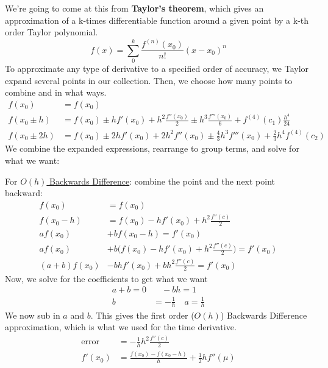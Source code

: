 \documentclass[12pt]{article}
\begin{document}
We're going to come at this from \textbf{Taylor's theorem}, which gives an approximation of a k-times differentiable function around a given point by a k-th order Taylor polynomial.
\[
f(x) = \sum_{0}^{k} \frac{f^{(n)}(x_0)}{n!}(x - x_0)^n
\]
To approximate any type of derivative to a specified order of accuracy, we Taylor expand several points in our collection. Then, we choose how many points to combine and in what ways. 
\begin{align*}
f(x_0) &= f(x_0)\\
%
f(x_0 \pm h) &= f(x_0) \pm hf'(x_0) + h^2\frac{f''(x_0)}{2} \pm h^3\frac{f'''(x_0)}{6} + f^{(4)}(c_1)\frac{h^4}{24} \\
%
f(x_0 \pm 2h) &= f(x_0) \pm 2h f'(x_0) + 2 h^2 f''(x_0) \pm \frac{4}{3} h^3 f'''(x_0) + \frac{2}{3}h^4 f^{(4)}(c_2)
\end{align*}
We combine the expanded expressions, rearrange to group terms, and solve for what we want:

For \underline{$O(h)$ Backwards Difference}: combine the point and the next point backward:
\begin{align*}
f(x_0) &= f(x_0)\\
f(x_0 - h) &= f(x_0) - hf'(x_0) + h^2\frac{f''(c)}{2}\\
a f(x_0) &+ b f(x_0 - h) = f'(x_0) \\
a f(x_0) &+ b \bigl(f(x_0) - hf'(x_0) + h^2\frac{f''(c)}{2} \bigr) = f'(x_0) \\
(a+b)f(x_0) &-bh f'(x_0) + b h^2\frac{f''(c)}{2} = f'(x_0)
\end{align*}
%
Now, we solve for the coefficients to get what we want
\begin{align*}
a+b = 0 &\quad -bh = 1 \\
b &= -\frac{1}{h} \quad a = \frac{1}{h}
\end{align*}
%
We now sub in $a$ and $b$. This gives the first order ($O(h)$) Backwards Difference approximation, which is what we used for the time derivative.
\begin{align*}
\text{error }&= -\frac{1}{h}h^2\frac{f''(c)}{2}\\
f'(x_0) &= \frac{f(x_0) - f(x_0 - h)}{h} + \frac{1}{2}hf''(\mu)
\end{align*}


\end{document}
